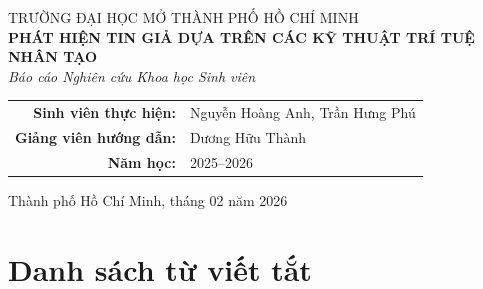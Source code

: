 \documentclass[12pt, a4paper]{report}
\begin{document}
\hypersetup{pageanchor=false}

\begin{titlepage}
\centering
{\large TRƯỜNG ĐẠI HỌC MỞ THÀNH PHỐ HỒ CHÍ MINH }\\[2cm]

{\LARGE\bfseries PHÁT HIỆN TIN GIẢ DỰA TRÊN CÁC KỸ THUẬT TRÍ TUỆ NHÂN TẠO}\\[1.5cm]

{\large\textit{Báo cáo Nghiên cứu Khoa học Sinh viên}}\\[3cm]

\begin{tabular}{r l}
  \textbf{Sinh viên thực hiện:} & Nguyễn Hoàng Anh, Trần Hưng Phú\\[0.3em]
  \textbf{Giảng viên hướng dẫn:} & Dương Hữu Thành \\[0.3em]
  \textbf{Năm học:} & 2025--2026 \\
\end{tabular}

\vfill
{\large Thành phố Hồ Chí Minh, tháng 02 năm 2026}
\end{titlepage}

\tableofcontents
\cleardoublepage
\hypersetup{pageanchor=true}
\setcounter{page}{1}

\listoftables
{}
\label{listoftables}
\newpage

\listoffigures
{}
\label{listoffigures}
\newpage

\chapter*{Danh sách từ viết tắt}
\label{abbrev}
\end{document}
